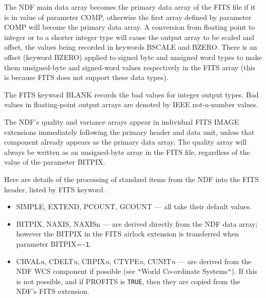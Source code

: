 \documentclass[twoside,11pt]{article}
\newcommand{\htmlref}[2]{#1}
\newcommand{\xref}[3]{#1}
\newcommand{\ssthitemlist}[1]{
  \latexonly{
  \mbox{} \\
  \vspace{-3.5ex}
  }
  \begin{itemize}
     #1
  \end{itemize}
}
\newcommand{\sstitem}{\item}
\newcommand{\sstitem}{\item}
\begin{document}
{{{         \sstitem
         The NDF main data array becomes the primary data array of the
         FITS file if it is in value of parameter COMP, otherwise the first
         array defined by parameter COMP will become the primary data
         array.  A conversion from floating point to integer or to a
         shorter integer type will cause the output array to be scaled and
         offset, the values being recorded in keywords BSCALE and BZERO.
         There is an offset (keyword BZERO) applied to signed byte and
         unsigned word types to make them unsigned-byte and signed-word
         values respectively in the FITS array (this is because FITS does
         not support these data types).

         \sstitem
         The FITS keyword BLANK records the \xref{bad values}{sun95}{se_badmasking}
         for integer output types.  Bad values in floating-point output arrays are
         denoted by IEEE not-a-number values.

         \sstitem
         The NDF's quality and variance arrays appear in individual
         FITS IMAGE extensions immediately following the primary header
         and data unit, unless that component already appears as the
         primary data array.  The quality array will always be written as
         an unsigned-byte array in the FITS file, regardless of the value
         of the parameter BITPIX.

         \sstitem
         Here are details of the processing of standard items from the
         NDF into the FITS header, listed by FITS keyword.
         \ssthitemlist{

            \sstitem
            SIMPLE, EXTEND, PCOUNT, GCOUNT --- all take their default
              values.

            \sstitem
            BITPIX, NAXIS, NAXISn --- are derived directly from the NDF
              data array; however the BITPIX in the FITS airlock extension
              is transferred when parameter BITPIX=\texttt{-1}.

            \sstitem
            CRVAL\textit{n}, CDELT\textit{n}, CRPIX\textit{n}, CTYPE\textit{n},
            CUNIT\textit{n} --- are derived
              from the NDF WCS component if possible (see 
              \htmlref{\texttt{"}World Co-ordinate Systems\texttt{"}}
                 {world_coordinate_systems}).
              If this is not possible, and if PROFITS is \texttt{TRUE}, then
              they are copied from the NDF's FITS extension.

}}}}
\end{document}
